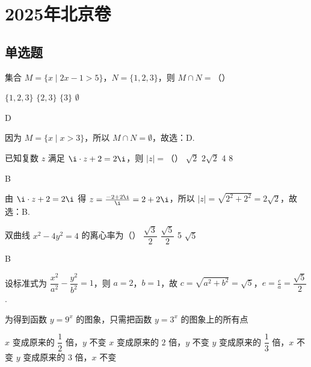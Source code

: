 \chapter{2025年北京卷}
\section{单选题}

\begin{problem}
集合 \(M = \{x\mid 2x - 1 > 5\}\)，\(N=\{1,2,3\}\)，则 \(M\cap N=\)（\quad）

\choices
    {\(\{1,2,3\}\)}
    {\(\{2,3\}\)}
    {\(\{3\}\)}
    {\(\emptyset\)}
\end{problem}

\begin{answer}
D
\end{answer}

\begin{solution}
因为 \(M = \{x\mid x > 3\}\)，所以 \(M\cap N=\emptyset\)，故选：D.
\end{solution}

\begin{problem}
已知复数 \(z\) 满足 \(\i\cdot z +2 = 2\i\)，则 \(|z| =\)（\quad）
\choices
    {\(\sqrt{2}\)}
    {\(2\sqrt{2}\)}
    {4}
    {8}
\end{problem}

\begin{answer}
B
\end{answer}

\begin{solution}
由 \(\i\cdot z +2 = 2\i\) 得 \(z=\frac{-2+2\i}{\i}=2+2\i\)，所以 \(|z|=\sqrt{2^2+2^2}=2\sqrt{2}\)，故选：B.
\end{solution}

\begin{problem}
双曲线 \(x^2-4y^2=4\) 的离心率为（\quad）
\choices
    {\(\dfrac{\sqrt{3}}{2}\)}
    {\(\dfrac{\sqrt{5}}{2}\)}
    {5}
    {\(\sqrt{5}\)}
\end{problem}

\begin{answer}
B
\end{answer}

\begin{solution}
设标准式为 \(\dfrac{x^2}{a^2}-\dfrac{y^2}{b^2}=1\)，则 \(a=2\)，\(b=1\)，故 \(c=\sqrt{a^2+b^2}=\sqrt{5}\)，\(e=\frac{c}{a}=\dfrac{\sqrt{5}}{2}\).
\end{solution}

\begin{problem}
为得到函数 \(y=9^x\) 的图象，只需把函数 \(y=3^x\) 的图象上的所有点

\choices
    {\(x\) 变成原来的 \(\dfrac12\) 倍，\(y\) 不变}
    {\(x\) 变成原来的 \(2\) 倍，\(y\) 不变}
    {\(y\) 变成原来的 \(\dfrac13\) 倍，\(x\) 不变}
    {\(y\) 变成原来的 \(3\) 倍，\(x\) 不变}
\end{problem}

